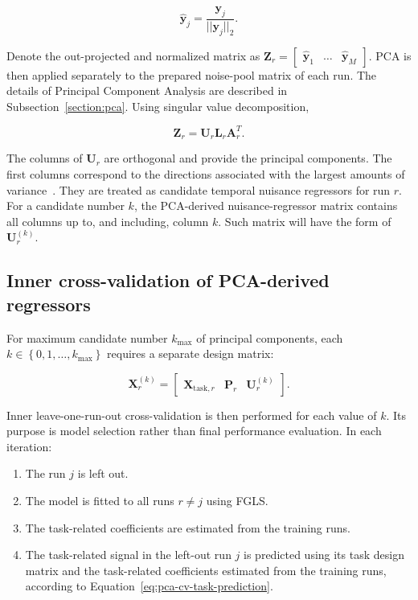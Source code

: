 \documentclass[english]{pwr_wmat_praca_dyplomowa}
\theoremstyle{definition}
\theoremstyle{remark}
\begin{document}
\begin{equation}
    \widehat{\mathbf{y}}_j = \frac{\mathbf{y}_j}{||\mathbf{y}_j||_2}.
\end{equation}

Denote the out-projected and normalized matrix as $\mathbf{Z}_r = \begin{bmatrix}\widehat{\mathbf{y}}_1 & \ldots &  \widehat{\mathbf{y}}_M\end{bmatrix}$. PCA is then applied separately to the prepared noise-pool matrix of each run. The details of Principal Component Analysis are described in Subsection~\ref{section:pca}. Using singular value decomposition,

\begin{equation}
    \mathbf{Z}_r = \mathbf{U}_r \mathbf{L}_r \mathbf{A}_r^T.
\end{equation}

The columns of $\mathbf{U}_r$ are orthogonal and provide the principal components. The first columns correspond to the directions associated with the largest amounts of variance~\cite{pca}. They are treated as candidate temporal nuisance regressors for run $r$. For a candidate number $k$, the PCA-derived nuisance-regressor matrix contains all columns up to, and including, column $k$. Such matrix will have the form of $\mathbf{U}_r^{(k)}$.

\subsection{Inner cross-validation of PCA-derived regressors}
\label{section:cv-pca-number}

For maximum candidate number $k_{\max}$ of principal components, each $k \in \left\{0,1,\ldots,k_{\max}\right\}$ requires a separate design matrix:

\begin{equation}
    \mathbf{X}_r^{(k)} =
    \begin{bmatrix}
        \mathbf{X}_{\mathrm{task},r} & \mathbf{P}_r & \mathbf{U}_r^{(k)}
    \end{bmatrix}.
\end{equation}

Inner leave-one-run-out cross-validation is then performed for each value of $k$. Its purpose is model selection rather than final performance evaluation. In each iteration:

\begin{enumerate}
    \item The run $j$ is left out.
    \item The model is fitted to all runs $r\neq j$ using FGLS.
    \item The task-related coefficients are estimated from the training runs.
    \item The task-related signal in the left-out run $j$ is predicted using its task design matrix and the task-related coefficients estimated from the training runs, according to Equation~\eqref{eq:pca-cv-task-prediction}.
\end{enumerate}
\end{document}
